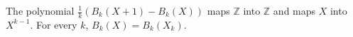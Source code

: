 The polynomial $\frac{1}{k}(B_k(X+1) - B_k(X))$ maps $\mathbb{Z}$ into $\mathbb{Z}$ and maps $X$ into $X^{k-1}$. For every $k$, $B_k(X) = B_k(X_k)$.
